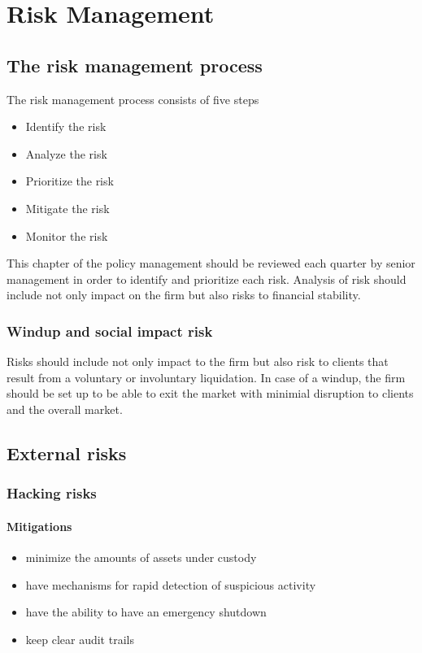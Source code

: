 \chapter{Risk Management}

\section{The risk management process}

The risk management process consists of five steps
\begin{itemize}
\item Identify the risk
\item Analyze the risk
\item Prioritize the risk
\item Mitigate the risk
\item Monitor the risk
\end{itemize}

This chapter of the policy management should be reviewed each quarter
by senior management in order to identify and prioritize each risk.
Analysis of risk should include not only impact on the firm but also
risks to financial stability.

\subsection{Windup and social impact risk}
Risks should include not only impact to the firm but also risk to
clients that result from a voluntary or involuntary liquidation.  In
case of a windup, the firm should be set up to be able to exit the
market with minimial disruption to clients and the overall market.

\section{External risks}

\subsection{Hacking risks}
\subsubsection{Mitigations}
\begin{itemize}
\item minimize the amounts of assets under custody
\item have mechanisms for rapid detection of suspicious activity
\item have the ability to have an emergency shutdown
  \item keep clear audit trails
\end{itemize}
